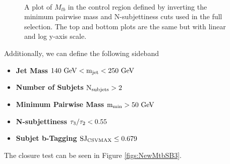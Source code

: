 \begin{figure}[Htcb]
\centering
{}\\
\caption{A plot of $M_{tb}$ in the control region defined by inverting the minimum pairwise mass and N-subjettiness cuts used in the full selection.  The top and bottom plots are the same but with linear and log y-axis scale.}
\label{figs:NewMtbSB2}
\end{figure}

Additionally, we can define the following sideband 
\begin{itemize}
\item {\bf Jet Mass}  $\mathrm{\boldmath 140~\mathrm{GeV} < m_{\text{jet}} < 250~\mathrm{GeV}}$ 
\item {\bf Number of Subjets}  $\mathrm{\boldmath N_{\text{subjets}} > 2}$ 
\item {\bf Minimum Pairwise Mass} $\mathrm{\boldmath m_{\text{min}} > 50~\mathrm{GeV}}$ 
\item {\bf N-subjettiness} $\mathrm{\boldmath \tau_3/\tau_2 < 0.55}$ 
\item {\bf Subjet b-Tagging} $\mathrm{\boldmath SJ_{\text{CSVMAX}} \leq 0.679}$ 
\end{itemize}
The closure test can be seen in Figure \ref{figs:NewMtbSB3}.

